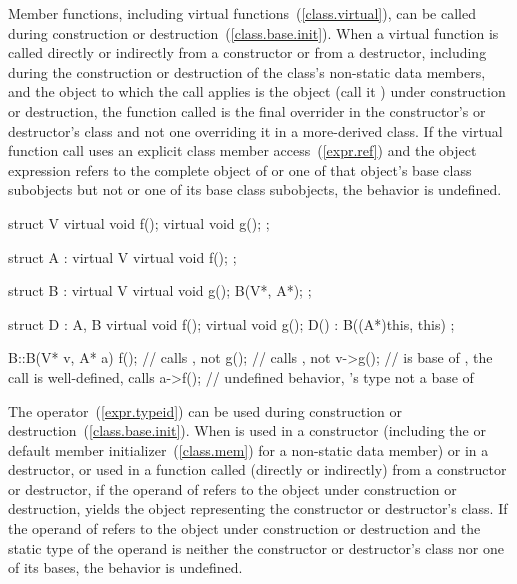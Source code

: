 \pnum
{}%
%
%
%
Member functions, including virtual functions~(\ref{class.virtual}), can be called
during construction or destruction~(\ref{class.base.init}).
When a virtual function is called directly or indirectly from a constructor
or from a destructor,
including during the construction or destruction of the class's non-static data
members,
and the object to which the call applies is the object (call it ) under construction or
destruction,
the function called is the
final overrider in the constructor's or destructor's class and not one
overriding it in a more-derived class.
If the virtual function call uses an explicit class member access~(\ref{expr.ref})
and the object expression refers to
the complete object of  or one of that object's base class subobjects
but not  or one of its base class subobjects, the behavior
is undefined.
\begin{example}

\begin{codeblock}
struct V {
  virtual void f();
  virtual void g();
};

struct A : virtual V {
  virtual void f();
};

struct B : virtual V {
  virtual void g();
  B(V*, A*);
};

struct D : A, B {
  virtual void f();
  virtual void g();
  D() : B((A*)this, this) { }
};

B::B(V* v, A* a) {
  f();              // calls , not 
  g();              // calls , not 
  v->g();           //  is base of , the call is well-defined, calls 
  a->f();           // undefined behavior, 's type not a base of 
}
\end{codeblock}
\end{example}

\pnum
{}%
%
%
%
The
operator~(\ref{expr.typeid}) can be used during construction or destruction~(\ref{class.base.init}).
When
is used in a constructor (including the
 or default member initializer~(\ref{class.mem})
for a non-static data member)
or in a destructor, or used in a function called (directly or indirectly) from
a constructor or destructor, if the operand of
refers to the object under construction or destruction,
yields the
object representing the constructor or destructor's class.
If the operand of
refers to the object under construction or destruction and the static type of
the operand is neither the constructor or destructor's class nor one of its
bases, the behavior is undefined.

